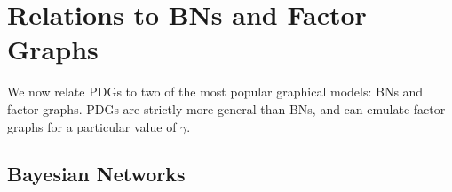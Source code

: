 \documentclass{article}
\theoremstyle{plain}
\theoremstyle{definition}
\theoremstyle{remark}
\numberwithin{equation}{section}
\begin{document}
\section{Relations to BNs and Factor Graphs}\label{sec:other-graphical-models} 
We now relate PDGs to two of the most popular graphical models: BNs and factor
graphs. PDGs are strictly more general than BNs, and can emulate factor graphs
for a particular value of $\gamma$. 
\begin{vfull}
\subsection{Bayesian Networks} 
\end{vfull}
\label{sec:bn-convert}
\end{document}
